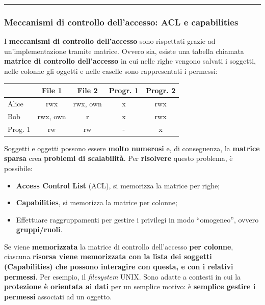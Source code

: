 \documentclass[a4paper]{article}
\newcommand{\longline}{\noindent\rule{\textwidth}{0.4pt}}
\newcommand{\dquotes}[1]{``#1''}
\begin{document}
	\longline
	
	\subsubsection{Meccanismi di controllo dell'accesso: ACL e capabilities}
	
	I \textcolor{Red3}{\textbf{meccanismi di controllo dell'accesso}} sono rispettati grazie ad un'implementazione tramite matrice. Ovvero sia, esiste una tabella chiamata \textbf{matrice di controllo dell'accesso} in cui nelle righe vengono salvati i soggetti, nelle colonne gli oggetti e nelle caselle sono rappresentati i permessi:
	\begin{table}[!htp]
		\centering
		\begin{tabular}{@{} l | c | c | c | c @{}}
			\toprule
			& File 1 & File 2 & Progr. 1 & Progr. 2 \\
			\midrule
			Alice 	& \textsf{rwx} & \textsf{rwx}, \textsf{own} & \textsf{x} & \textsf{rwx} \\
			Bob		& \textsf{rwx}, \textsf{own} & \textsf{r} & \textsf{x} & \textsf{rwx} \\
			Prog. 1	& \textsf{rw} & \textsf{rw} & \textsf{-} & \textsf{x} \\
			\bottomrule
		\end{tabular}
	\end{table}
	
	\noindent
	Soggetti e oggetti possono essere \textbf{molto numerosi} e, di conseguenza, la \textbf{matrice sparsa} crea \textbf{problemi di scalabilità}. Per \textcolor{Green4}{\textbf{risolvere}} questo problema, è possibile:
	\begin{itemize}
		\item \textcolor{Red3}{\textbf{Access Control List}} (ACL), si memorizza la matrice per righe;
		\item \textcolor{Red3}{\textbf{Capabilities}}, si memorizza la matrice per colonne;
		\item Effettuare raggruppamenti per gestire i privilegi in modo \dquotes{omogeneo}, ovvero \textcolor{Red3}{\textbf{gruppi/ruoli}}.
	\end{itemize}
	Se viene \textbf{memorizzata} la matrice di controllo dell'accesso \textbf{per colonne}, ciascuna \textbf{risorsa viene memorizzata con la lista dei soggetti (\textcolor{Red3}{\textbf{Capabilities}}) che possono interagire con questa, e con i relativi permessi}. Per esempio, il \emph{filesystem} UNIX. Sono adatte a contesti in cui la \textbf{protezione è orientata ai dati} per un semplice motivo: è \textbf{semplice gestire i permessi} associati ad un oggetto.
	
\end{document}
